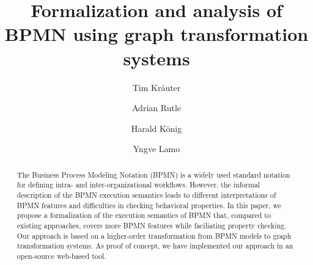\documentclass[runningheads]{llncs}
\begin{document}
%
\title{Formalization and analysis of BPMN using graph transformation systems}
%
%
\author{Tim Kr\"{a}uter \and
Adrian Rutle \and
Harald K\"{o}nig \and
Yngve Lamo}
%
%
%
\maketitle              %
%
\begin{abstract}
The Business Process Modeling Notation (BPMN) is a widely used standard notation for defining intra- and inter-organizational workflows.
However, the informal description of the BPMN execution semantics leads to different interpretations of BPMN features and difficulties in checking behavioral properties.
In this paper, we propose a formalization of the execution semantics of BPMN that, compared to existing approaches, covers more BPMN features while faciliating property checking.
Our approach is based on a higher-order transformation from BPMN models to graph transformation systems.
As proof of concept, we have implemented our approach in an open-source web-based tool.

\end{abstract}
\end{document}
